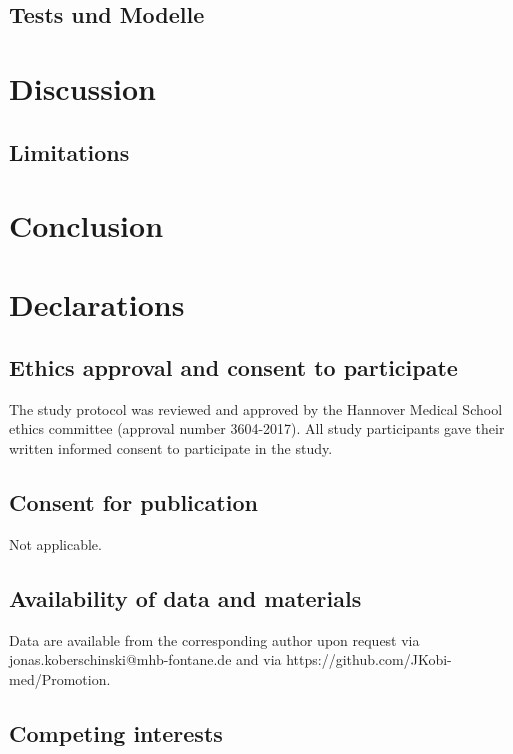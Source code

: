 \documentclass[
]{agujournal2019}
\begin{document}
\subsection{Tests und Modelle}\label{tests-und-modelle}

\section{Discussion}\label{discussion}

\subsection{Limitations}\label{limitations}

\section{Conclusion}\label{conclusion}

\section{Declarations}\label{declarations}

\subsection{Ethics approval and consent to
participate}\label{ethics-approval-and-consent-to-participate}

The study protocol was reviewed and approved by the Hannover Medical
School ethics committee (approval number 3604-2017). All study
participants gave their written informed consent to participate in the
study.

\subsection{Consent for publication}\label{consent-for-publication}

Not applicable.

\subsection{Availability of data and
materials}\label{availability-of-data-and-materials}

Data are available from the corresponding author upon request via
jonas.koberschinski@mhb-fontane.de and via
https://github.com/JKobi-med/Promotion.

\subsection{Competing interests}\label{competing-interests}
\end{document}
